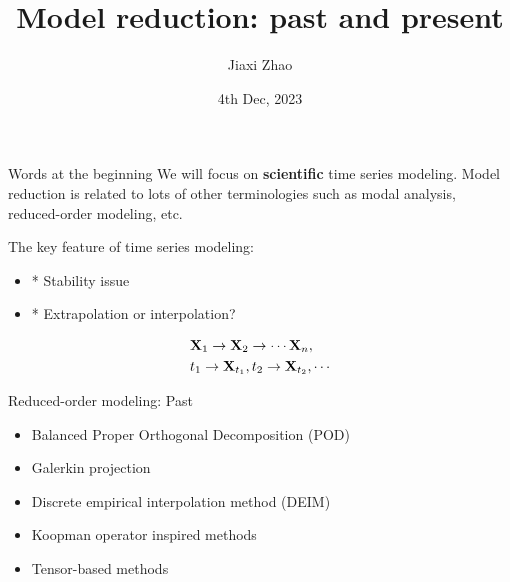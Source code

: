 \documentclass{beamer}
\title[Model Reduction]{Model reduction: past and present}
\author[ZJX]{Jiaxi Zhao}
\date{4th Dec, 2023}
\begin{document}
\par \setlength{\parindent}{2em}

\begin{frame}
\titlepage

\end{frame}

\begin{frame}{Words at the beginning}
	We will focus on \textbf{scientific} time series modeling. Model reduction is related to lots of other terminologies such as 
	modal analysis, reduced-order modeling, etc.

	The key feature of time series modeling:
	\begin{itemize}
		\item * Stability issue
		\item * Extrapolation or interpolation?
	\end{itemize}
	\begin{equation}
		\begin{aligned}
			& \mathbf{X}_1 \rightarrow \mathbf{X}_2 \rightarrow \cdots \mathbf{X}_n,		\\
			& t_1 \rightarrow \mathbf{X}_{t_1}, t_2 \rightarrow \mathbf{X}_{t_2}, \cdots
		\end{aligned}
	\end{equation}
\end{frame}

\begin{frame}{Reduced-order modeling: Past}
	\begin{itemize}
		\item Balanced Proper Orthogonal Decomposition (POD)
		\item Galerkin projection
		\item Discrete empirical interpolation method (DEIM)
		\item Koopman operator inspired methods
		\item Tensor-based methods\footnotemark
	\end{itemize}
\end{frame}
\end{document}
